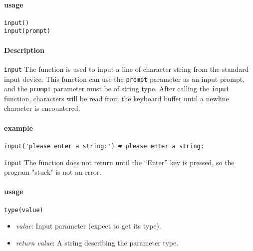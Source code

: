 
\paragraph{usage}
\begin{lstlisting}[language=berry, numbers=none]
input()
input(prompt)
\end{lstlisting}

\paragraph{Description}
\texttt{input} The function is used to input a line of character string from the standard input device. This function can use the \texttt{prompt} parameter as an input prompt, and the \texttt{prompt} parameter must be of string type.
After calling the \texttt{input} function, characters will be read from the keyboard buffer until a newline character is encountered.

\paragraph{example}
\begin{lstlisting}[language=berry, numbers=none]
input('please enter a string:') # please enter a string:
\end{lstlisting}
\texttt{input} The function does not return until the ``Enter'' key is pressed, so the program "stuck" is not an error.

 \label{section::baselib_type}

\paragraph{usage}
\begin{lstlisting}[language=berry, numbers=none]
type(value)
\end{lstlisting}

\begin{itemize}
    \item \emph{value}: Input parameter (expect to get its type).
    \item \emph{return value}: A string describing the parameter type.
\end{itemize}

